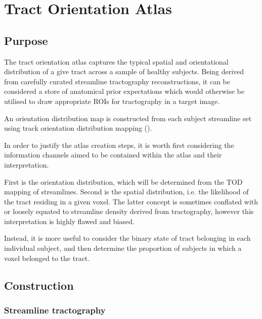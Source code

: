 \chapter{Tract Orientation Atlas}
\label{chapterlabel2}


\section{Purpose}


The tract orientation atlas captures the typical spatial and orientational distribution of a give tract across a sample of healthy subjects. Being derived from carefully curated streamline tractography reconstructions, it can be considered a store of anatomical prior expectations which would otherwise be utilised to draw appropriate ROIs for tractography in a target image.


An orientation distribution map is constructed from each subject streamline set using track orientation distribution mapping ().\autocite{Dhollander2014}

In order to justify the atlas creation steps, it is worth first considering the information channels aimed to be contained within the atlas and their interpretation.

First is the orientation distribution, which will be determined from the TOD mapping of streamlines.
Second is the spatial distribution, i.e. the likelihood of the tract residing in a given voxel.
The latter concept is sometimes conflated with or loosely equated to streamline density derived from tractography, however this interpretation is highly flawed and biased.

Instead, it is more useful to consider the binary state of tract belonging in each individual subject, and then determine the proportion of subjects in which a voxel belonged to the tract.

\section{Construction}


\subsection{Streamline tractography}

